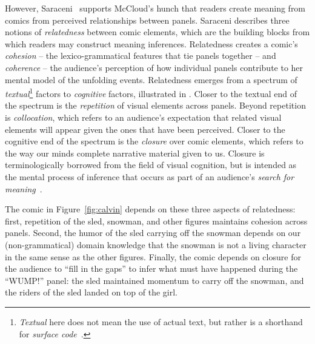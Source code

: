However, Saraceni~\cite{saraceni2016relatedness} supports
McCloud's hunch that readers create meaning from comics from perceived
relationships between panels.  Saraceni describes three notions of
\emph{relatedness} between comic elements, which are the building blocks
from which readers may construct meaning inferences.  
Relatedness creates  a comic's \emph{cohesion} -- the lexico-grammatical
features that tie panels together -- and \emph{coherence} -- the audience's
perception of how individual panels contribute to her mental model of the
unfolding events. Relatedness emerges from a spectrum of
\emph{textual}\footnote{\emph{Textual} here does not mean the use of actual
text, but rather is a shorthand for \emph{surface
code}~\cite{zwaan1998situation}.} factors to \emph{cognitive} factors,
illustrated in .
%
Closer to the textual end of the spectrum is the \emph{repetition} of
visual elements across panels. Beyond repetition is \emph{collocation},
which refers to an audience's expectation that related visual elements will
appear given the ones that have been perceived. Closer to the cognitive end
of the spectrum is the \emph{closure} over comic elements, which refers to
the way our minds complete narrative material given to us. Closure is
terminologically borrowed from the field of visual cognition, but is
intended as the mental process of inference that occurs as part of an
audience's \emph{search for meaning}~\cite{gerrig1994readers}.

%
The comic in Figure~\ref{fig:calvin} depends on these three 
aspects of relatedness: first, repetition of the sled, snowman, and other
figures maintains cohesion across panels. Second, the humor of the sled
carrying off the snowman depends on our (non-grammatical) domain knowledge
that the snowman is not a living character in the same sense as the other
figures. Finally, the comic depends on closure for the audience to ``fill
in the gaps'' to infer what must have happened during the ``WUMP!'' panel:
the sled maintained momentum to carry off the snowman, and the riders of
the sled landed on top of the girl.

